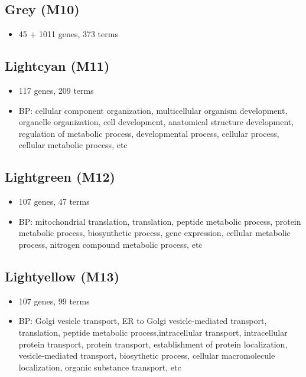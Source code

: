 \documentclass[]{article}
\providecommand{\tightlist}{%
  \setlength{\itemsep}{0pt}\setlength{\parskip}{0pt}}
\begin{document}
\hypertarget{grey-m10}{%
\subsection{Grey (M10)}\label{grey-m10}}

\begin{itemize}
\tightlist
\item
  45 + 1011 genes, 373 terms
\end{itemize}

\hypertarget{lightcyan-m11}{%
\subsection{Lightcyan (M11)}\label{lightcyan-m11}}

\begin{itemize}
\tightlist
\item
  117 genes, 209 terms
\item
  BP: cellular component organization, multicellular organism
  development, organelle organization, cell development, anatomical
  structure development, regulation of metabolic process, developmental
  process, cellular process, cellular metabolic process, etc
\end{itemize}

\hypertarget{lightgreen-m12}{%
\subsection{Lightgreen (M12)}\label{lightgreen-m12}}

\begin{itemize}
\tightlist
\item
  107 genes, 47 terms
\item
  BP: mitochondrial translation, translation, peptide metabolic process,
  protein metabolic process, biosynthetic process, gene expression,
  cellular metabolic process, nitrogen compound metabolic process, etc
\end{itemize}

\hypertarget{lightyellow-m13}{%
\subsection{Lightyellow (M13)}\label{lightyellow-m13}}

\begin{itemize}
\tightlist
\item
  107 genes, 99 terms
\item
  BP: Golgi vesicle transport, ER to Golgi vesicle-mediated transport,
  translation, peptide metabolic process,intracellular transport,
  intracellular protein transport, protein transport, establishment of
  protein localization, vesicle-mediated transport, biosythetic process,
  cellular macromolecule localization, organic substance transport, etc
\end{itemize}
\end{document}
